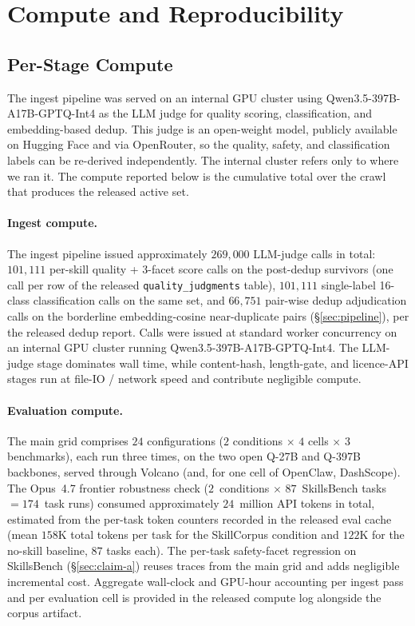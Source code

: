 \section{Compute and Reproducibility}
\label{app:compute-repro}

\subsection{Per-Stage Compute}
\label{app:compute}

The ingest pipeline was served on an internal GPU cluster using
Qwen3.5-397B-A17B-GPTQ-Int4 as the LLM judge for quality
scoring, classification, and embedding-based dedup.  This judge
is an open-weight model, publicly available on Hugging Face and
via OpenRouter, so the quality, safety, and classification labels
can be re-derived independently.  The internal cluster refers only
to where we ran it.  The compute
reported below is the cumulative total over the crawl that
produces the released active set.

\paragraph{Ingest compute.}
The ingest pipeline issued approximately $269{,}000$ LLM-judge
calls in total: $101{,}111$ per-skill quality + 3-facet score
calls on the post-dedup survivors (one call per row of the
released \texttt{quality\_judgments} table), $101{,}111$
single-label 16-class classification calls on the same set,
and $66{,}751$ pair-wise dedup adjudication calls on the
borderline embedding-cosine near-duplicate pairs
(\S\ref{sec:pipeline}), per the released dedup report.  Calls were issued at standard worker concurrency
on an internal GPU cluster running
Qwen3.5-397B-A17B-GPTQ-Int4.  The LLM-judge stage dominates
wall time, while content-hash, length-gate, and licence-API stages run
at file-IO / network speed and contribute negligible compute.

\paragraph{Evaluation compute.}
The main grid comprises $24$ configurations ($2$ conditions
$\times$ $4$ cells $\times$ $3$ benchmarks), each run three
times, on the two open Q-27B and
Q-397B backbones, served through Volcano (and, for one cell of
OpenClaw, DashScope).  The Opus~4.7
frontier robustness check ($2$~conditions $\times$ $87$~SkillsBench
tasks $= 174$~task runs) consumed approximately $24$~million
API tokens in total, estimated from the per-task token counters
recorded in the released eval cache
(mean $158$K total tokens per task for the SkillCorpus condition
and $122$K for the no-skill baseline, $87$ tasks each).  The per-task safety-facet regression on
SkillsBench (\S\ref{sec:claim-a}) reuses traces from the main
grid and adds negligible incremental cost.  Aggregate
wall-clock and GPU-hour accounting per ingest pass and per
evaluation cell is provided in the released compute log
alongside the corpus artifact.

